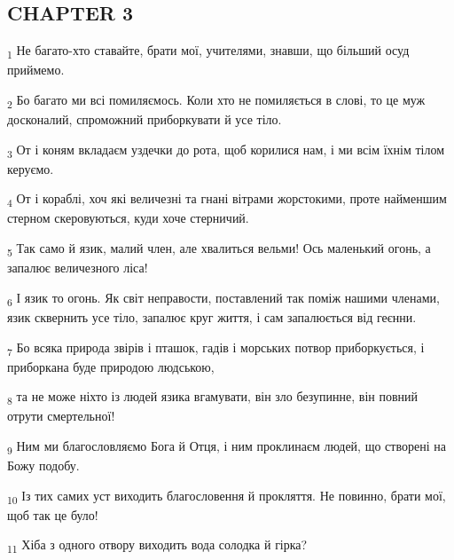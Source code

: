 \subsection{CHAPTER 3}
\begin{tcolorbox}
\textsubscript{1} Не багато-хто ставайте, брати мої, учителями, знавши, що більший осуд приймемо.
\end{tcolorbox}
\begin{tcolorbox}
\textsubscript{2} Бо багато ми всі помиляємось. Коли хто не помиляється в слові, то це муж досконалий, спроможний приборкувати й усе тіло.
\end{tcolorbox}
\begin{tcolorbox}
\textsubscript{3} От і коням вкладаєм уздечки до рота, щоб корилися нам, і ми всім їхнім тілом керуємо.
\end{tcolorbox}
\begin{tcolorbox}
\textsubscript{4} От і кораблі, хоч які величезні та гнані вітрами жорстокими, проте найменшим стерном скеровуються, куди хоче стерничий.
\end{tcolorbox}
\begin{tcolorbox}
\textsubscript{5} Так само й язик, малий член, але хвалиться вельми! Ось маленький огонь, а запалює величезного ліса!
\end{tcolorbox}
\begin{tcolorbox}
\textsubscript{6} І язик то огонь. Як світ неправости, поставлений так поміж нашими членами, язик сквернить усе тіло, запалює круг життя, і сам запалюється від геєнни.
\end{tcolorbox}
\begin{tcolorbox}
\textsubscript{7} Бо всяка природа звірів і пташок, гадів і морських потвор приборкується, і приборкана буде природою людською,
\end{tcolorbox}
\begin{tcolorbox}
\textsubscript{8} та не може ніхто із людей язика вгамувати, він зло безупинне, він повний отрути смертельної!
\end{tcolorbox}
\begin{tcolorbox}
\textsubscript{9} Ним ми благословляємо Бога й Отця, і ним проклинаєм людей, що створені на Божу подобу.
\end{tcolorbox}
\begin{tcolorbox}
\textsubscript{10} Із тих самих уст виходить благословення й прокляття. Не повинно, брати мої, щоб так це було!
\end{tcolorbox}
\begin{tcolorbox}
\textsubscript{11} Хіба з одного отвору виходить вода солодка й гірка?
\end{tcolorbox}
